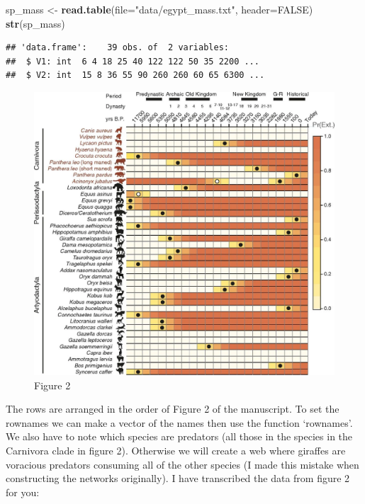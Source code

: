 \documentclass[
]{article}
\newenvironment{Shaded}{\begin{snugshade}}{\end{snugshade}}
\newcommand{\AttributeTok}[1]{\textcolor[rgb]{0.13,0.29,0.53}{#1}}
\newcommand{\ConstantTok}[1]{\textcolor[rgb]{0.56,0.35,0.01}{#1}}
\newcommand{\FunctionTok}[1]{\textcolor[rgb]{0.13,0.29,0.53}{\textbf{#1}}}
\newcommand{\NormalTok}[1]{#1}
\newcommand{\OtherTok}[1]{\textcolor[rgb]{0.56,0.35,0.01}{#1}}
\newcommand{\StringTok}[1]{\textcolor[rgb]{0.31,0.60,0.02}{#1}}
\begin{document}
\begin{Shaded}
\begin{Highlighting}[]
\NormalTok{sp\_mass }\OtherTok{\textless{}{-}} \FunctionTok{read.table}\NormalTok{(}\AttributeTok{file=}\StringTok{"data/egypt\_mass.txt"}\NormalTok{, }\AttributeTok{header=}\ConstantTok{FALSE}\NormalTok{)}
\FunctionTok{str}\NormalTok{(sp\_mass)}
\end{Highlighting}
\end{Shaded}

\begin{verbatim}
## 'data.frame':    39 obs. of  2 variables:
##  $ V1: int  6 4 18 25 40 122 122 50 35 2200 ...
##  $ V2: int  15 8 36 55 90 260 260 60 65 6300 ...
\end{verbatim}

\begin{figure}
\centering
\includegraphics{figures/figure2.jpg}
\caption{Figure 2}
\end{figure}

The rows are arranged in the order of Figure 2 of the manuscript. To set
the rownames we can make a vector of the names then use the function
`rownames'. We also have to note which species are predators (all those
in the species in the Carnivora clade in figure 2). Otherwise we will
create a web where giraffes are voracious predators consuming all of the
other species (I made this mistake when constructing the networks
originally). I have transcribed the data from figure 2 for you:
\end{document}
